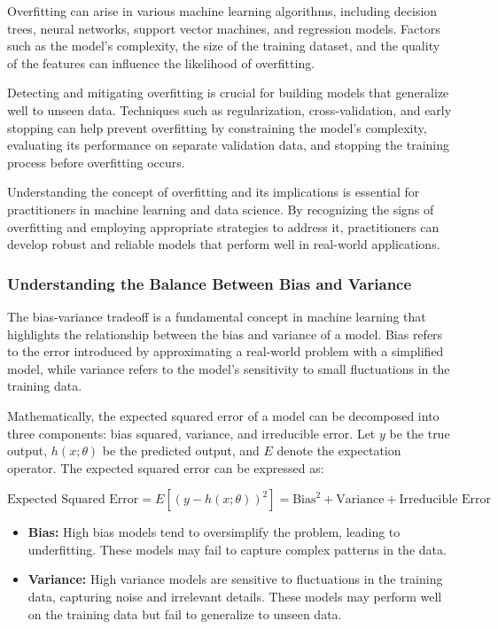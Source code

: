 \documentclass[12pt]{book} %
\begin{document}
Overfitting can arise in various machine learning algorithms, including decision trees, neural networks, support vector machines, and regression models. Factors such as the model's complexity, the size of the training dataset, and the quality of the features can influence the likelihood of overfitting.

Detecting and mitigating overfitting is crucial for building models that generalize well to unseen data. Techniques such as regularization, cross-validation, and early stopping can help prevent overfitting by constraining the model's complexity, evaluating its performance on separate validation data, and stopping the training process before overfitting occurs.

Understanding the concept of overfitting and its implications is essential for practitioners in machine learning and data science. By recognizing the signs of overfitting and employing appropriate strategies to address it, practitioners can develop robust and reliable models that perform well in real-world applications.


\subsubsection{Understanding the Balance Between Bias and Variance}

The bias-variance tradeoff is a fundamental concept in machine learning that highlights the relationship between the bias and variance of a model. Bias refers to the error introduced by approximating a real-world problem with a simplified model, while variance refers to the model's sensitivity to small fluctuations in the training data. 

Mathematically, the expected squared error of a model can be decomposed into three components: bias squared, variance, and irreducible error. Let \(y\) be the true output, \(h(x; \theta)\) be the predicted output, and \(E\) denote the expectation operator. The expected squared error can be expressed as:

\[
\text{Expected Squared Error} = E[(y - h(x; \theta))^2] = \text{Bias}^2 + \text{Variance} + \text{Irreducible Error}
\]

\begin{itemize}
    \item \textbf{Bias:} High bias models tend to oversimplify the problem, leading to underfitting. These models may fail to capture complex patterns in the data.
    
    \item \textbf{Variance:} High variance models are sensitive to fluctuations in the training data, capturing noise and irrelevant details. These models may perform well on the training data but fail to generalize to unseen data.
\end{itemize}
\end{document}
